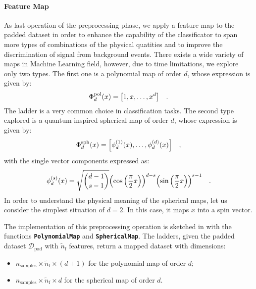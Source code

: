\documentclass[../main/main.tex]{subfiles}
\begin{document}
\paragraph{Feature Map}
As last operation of the preprocessing phase, we apply a feature map to the padded dataset in order to enhance the capability of the classificator to span more types of combinations of the physical quatities and to improve the discrimination of signal from background events. There exists a wide variety of maps in Machine Learning field, however, due to time limitations, we explore only two types. The first one is a polynomial map of order \( d \), whose expression is given by:
\begin{equation}
    \Phi^{\mathrm{pol}}_{d}(x)
    =
    \qty[1, x, \dots ,  x^{d}]
    \quad .
\end{equation}
The ladder is a very common choice in classification tasks. The second type explored is a quantum-inspired spherical map of order \( d \), whose expression is given by:
\begin{equation}
    \Phi^{\mathrm{sph}}_{d}(x)
    =
    \qty[\phi^{(1)}_{d}(x), \dots, \phi^{(d)}_{d}(x)]
    \quad ,
\end{equation}
with the single vector components expressed as:
\begin{equation}
    \phi_{d}^{(s)}(x)
    =
    \sqrt{{{d-1} \choose {s-1}}}
    \qty( \cos\qty(\frac{\pi}{2} x) )^{d-s}
    \qty( \sin\qty(\frac{\pi}{2} x) )^{s-1}
    \quad .
\end{equation}
In order to understand the physical meaning of the spherical maps, let us consider the simplest situation of \( d = 2 \). In this case, it maps \( x \) into a spin vector.

The implementation of this preprocessing operation is sketched in  with the functions \texttt{\bfseries PolynomialMap} and \texttt{\bfseries SphericalMap}. The ladders, given the padded dataset \( \mathcal{D}_{\mathrm{pad}} \) with \( \tilde{n}_{\mathrm{f}} \) features, return a mapped dataset with dimensions:
\begin{itemize}
    \item \( n_{\mathrm{samples}} \times \tilde{n}_{\mathrm{f}} \times (d+1) \) for the polynomial map of order \( d \);
    \item \( n_{\mathrm{samples}} \times \tilde{n}_{\mathrm{f}} \times d \) for the spherical map of order \( d \).
\end{itemize}
\end{document}
